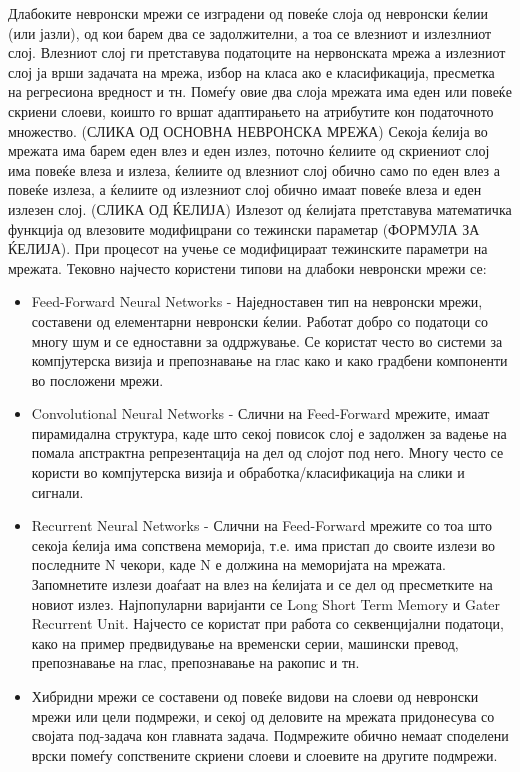 Длабоките невронски мрежи се изградени од повеќе слоја од невронски ќелии (или јазли), од кои барем два се задолжителни, а тоа се влезниот и излезлниот слој. Влезниот слој ги претставува податоците на нервонската мрежа а излезниот слој ја врши задачата на мрежа, избор на класа ако е класификација, пресметка на регресиона вредност и тн. Помеѓу овие два слоја мрежата има еден или повеќе скриени слоеви, коишто го вршат адаптирањето на атрибутите кон податочното множество. (СЛИКА ОД ОСНОВНА НЕВРОНСКА МРЕЖА) Секоја ќелија во мрежата има барем еден влез и еден излез, поточно ќелиите од скриениот слој има повеќе влеза и излеза, ќелиите од влезниот слој обично само по еден влез а повеќе излеза, а ќелиите од излезниот слој обично имаат повеќе влеза и еден излезен слој. (СЛИКА ОД ЌЕЛИЈА) Излезот од ќелијата претставува математичка функција од влезовите модифицрани со тежински параметар (ФОРМУЛА ЗА ЌЕЛИЈА). При процесот на учење се модифицираат тежинските параметри на мрежата.
Тековно најчесто користени типови на длабоки невронски мрежи се:
\begin{itemize}
    \item Feed-Forward Neural Networks - Наједноставен тип на невронски мрежи, составени од елементарни невронски ќелии. Работат добро со податоци со многу шум и се едноставни за оддржување. Се користат често во системи за компјутерска визија и препознавање на глас како и како градбени компоненти во посложени мрежи.
    \item Convolutional Neural Networks - Слични на Feed-Forward мрежите, имаат пирамидална структура, каде што секој повисок слој е задолжен за вадење на помала апстрактна репрезентација на дел од слојот под него. Многу често се користи во компјутерска визија и обработка/класификација на слики и сигнали.
    \item Recurrent Neural Networks - Слични на Feed-Forward мрежите со тоа што секоја ќелија има сопствена меморија, т.е. има пристап до своите излези во последните N чекори, каде N е должина на меморијата на мрежата. Запомнетите излези доаѓаат на влез на ќелијата и се дел од пресметките на новиот излез. Најпопуларни варијанти се Long Short Term Memory и Gater Recurrent Unit. Најчесто се користат при работа со секвенцијални податоци, како на пример предвидување на временски серии, машински превод, препознавање на глас, препознавање на ракопис и тн.
    \item Хибридни мрежи се составени од повеќе видови на слоеви од невронски мрежи или цели подмрежи, и секој од деловите на мрежата придонесува со својата под-задача кон главната задача. Подмрежите обично немаат споделени врски помеѓу сопствените скриени слоеви и слоевите на другите подмрежи.
\end{itemize}

